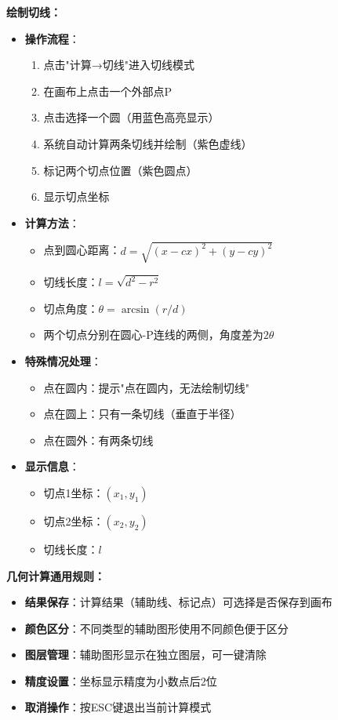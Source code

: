 \documentclass[12pt,a4paper]{article}
\begin{document}
\begin{tcolorbox}
\textbf{绘制切线：}
\begin{itemize}
    \item \textbf{操作流程}：
    \begin{enumerate}
        \item 点击"计算→切线"进入切线模式
        \item 在画布上点击一个外部点P
        \item 点击选择一个圆（用蓝色高亮显示）
        \item 系统自动计算两条切线并绘制（紫色虚线）
        \item 标记两个切点位置（紫色圆点）
        \item 显示切点坐标
    \end{enumerate}
    \item \textbf{计算方法}：
    \begin{itemize}
        \item 点到圆心距离：$d = \sqrt{(x-cx)^2 + (y-cy)^2}$
        \item 切线长度：$l = \sqrt{d^2 - r^2}$
        \item 切点角度：$\theta = \arcsin(r/d)$
        \item 两个切点分别在圆心-P连线的两侧，角度差为$2\theta$
    \end{itemize}
    \item \textbf{特殊情况处理}：
    \begin{itemize}
        \item 点在圆内：提示"点在圆内，无法绘制切线"
        \item 点在圆上：只有一条切线（垂直于半径）
        \item 点在圆外：有两条切线
    \end{itemize}
    \item \textbf{显示信息}：
    \begin{itemize}
        \item 切点1坐标：$(x_1, y_1)$
        \item 切点2坐标：$(x_2, y_2)$
        \item 切线长度：$l$
    \end{itemize}
\end{itemize}

\textbf{几何计算通用规则：}
\begin{itemize}
    \item \textbf{结果保存}：计算结果（辅助线、标记点）可选择是否保存到画布
    \item \textbf{颜色区分}：不同类型的辅助图形使用不同颜色便于区分
    \item \textbf{图层管理}：辅助图形显示在独立图层，可一键清除
    \item \textbf{精度设置}：坐标显示精度为小数点后2位
    \item \textbf{取消操作}：按ESC键退出当前计算模式
\end{itemize}
\end{tcolorbox}
\end{document}
